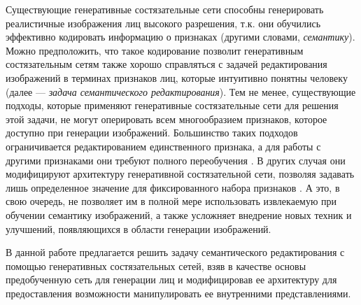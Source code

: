 Существующие генеративные состязательные сети способны генерировать реалистичные изображения лиц высокого разрешения, т.к. они обучились эффективно кодировать информацию о признаках (другими словами, \emph{семантику}). 
Можно предположить, что такое кодирование позволит генеративным состязательным сетям также хорошо справляться с задачей редактирования изображений в терминах признаков лиц, которые интуитивно понятны человеку (далее --- \emph{задача семантического редактирования}). 
Тем не менее, существующие подходы, которые применяют генеративные состязательные сети для решения этой задачи, не могут оперировать всем многообразием признаков, которое доступно при генерации изображений. 
Большинство таких подходов ограничивается редактированием единственного признака, а для работы с другими признаками они требуют полного переобучения \cite{cycle2017gan, residual2017gan}. 
В других случая они  модифицируют  архитектуру генеративной состязательной сети, позволяя задавать лишь определенное значение для фиксированного набора признаков \cite{choi2018stargan, liu2019stgan}. 
А это, в свою очередь, не позволяет им в полной мере использовать извлекаемую при обучении семантику изображений, а также усложняет внедрение новых техник и улучшений, появляющихся в области генерации изображений.

В данной работе предлагается решить задачу семантического редактирования с помощью генеративных состязательных сетей, взяв в качестве основы предобученную сеть для генерации лиц и модифицировав ее архитектуру для предоставления возможности манипулировать ее внутренними представлениями.
